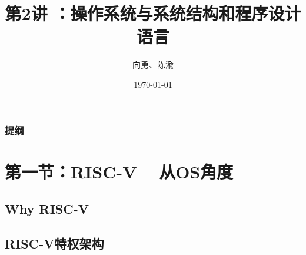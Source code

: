 \documentclass[UTF8]{ctexbeamer}
\title[第1讲]{第2讲 ：操作系统与系统结构和程序设计语言} %
\author{向勇、陈渝} %
\institute[清华大学] %
{
清华大学计算机系 \\ %
\medskip
\textit{xyong,yuchen@tsinghua.edu.cn} %
}
\date{\today} %
\begin{document}
\begin{frame}
\titlepage %
\end{frame}

\begin{frame}
\frametitle{提纲} %
\tableofcontents %
\end{frame}


\section{第一节：RISC-V -- 从OS角度 } %

\subsection{Why RISC-V} %
\subsection{RISC-V特权架构}
\end{document}
